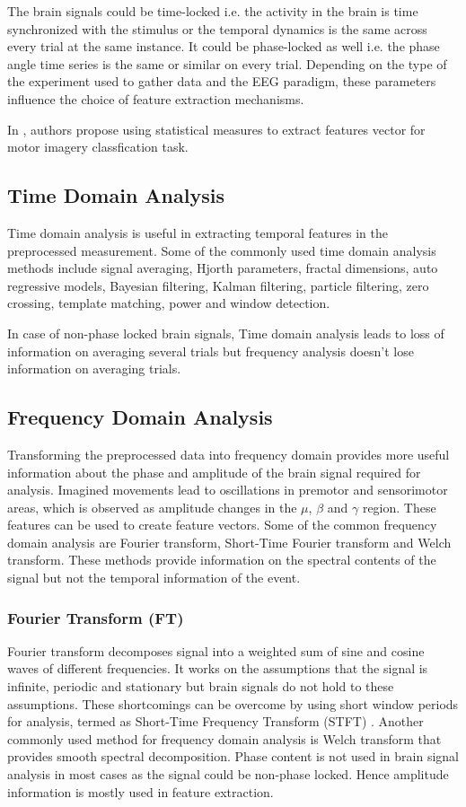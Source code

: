 The brain signals could be time-locked i.e. the activity in the brain is time synchronized with the stimulus or the temporal dynamics is the same across every trial at the same instance. It could be phase-locked as well i.e. the phase angle time series is the same or similar on every trial. Depending on the type of the experiment used to gather data and the EEG paradigm, these parameters influence the choice of feature extraction mechanisms. 

In \cite{2022_MI_classification}, authors propose using statistical measures to extract features vector for motor imagery classfication task.

\subsection{Time Domain Analysis}
Time domain analysis is useful in extracting temporal features in the preprocessed measurement. Some of the commonly used time domain analysis methods include signal averaging, Hjorth parameters, fractal dimensions, auto regressive models, Bayesian filtering, Kalman filtering, particle filtering, zero crossing, template matching, power and window detection.\par

In case of non-phase locked brain signals, Time domain analysis leads to loss of information on averaging several trials but frequency analysis doesn't lose information on averaging trials.

\subsection{Frequency Domain Analysis}
Transforming the preprocessed data into frequency domain provides more useful information about the phase and amplitude of the brain signal required for analysis. Imagined movements lead to oscillations in premotor and sensorimotor areas, which is observed as amplitude changes in the $\mu$, $\beta$ and $\gamma$ region. These features can be used to create feature vectors. Some of the common frequency domain analysis are Fourier transform, Short-Time Fourier transform and Welch transform. These methods provide information on the spectral contents of the signal but not the temporal information of the event. 

\subsubsection{Fourier Transform (FT)}
Fourier transform decomposes signal into a weighted sum of sine and cosine waves of different frequencies. It works on the assumptions that the signal is infinite, periodic and stationary but brain signals do not hold to these assumptions. These shortcomings can be overcome by using short window periods for analysis, termed as Short-Time Frequency Transform (STFT) . Another commonly used method for frequency domain analysis is Welch transform that provides smooth spectral decomposition. Phase content is not used in brain signal analysis in most cases as the signal could be non-phase locked. Hence amplitude information is mostly used in feature extraction. 

